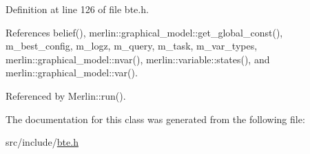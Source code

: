 Definition at line 126 of file bte.\+h.



References belief(), merlin\+::graphical\+\_\+model\+::get\+\_\+global\+\_\+const(), m\+\_\+best\+\_\+config, m\+\_\+logz, m\+\_\+query, m\+\_\+task, m\+\_\+var\+\_\+types, merlin\+::graphical\+\_\+model\+::nvar(), merlin\+::variable\+::states(), and merlin\+::graphical\+\_\+model\+::var().



Referenced by Merlin\+::run().



The documentation for this class was generated from the following file\+:\begin{DoxyCompactItemize}
\item 
src/include/\hyperlink{bte_8h}{bte.\+h}\end{DoxyCompactItemize}
